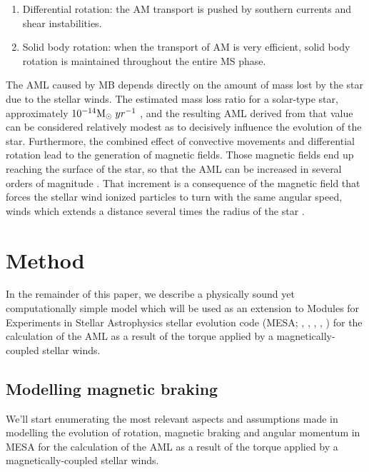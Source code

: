 \documentclass[fleqn,usenatbib]{mnras}
\begin{document}
\begin{enumerate}
    \item Differential rotation: the AM transport is pushed by southern currents and shear instabilities.
    \item Solid body rotation: when the transport of AM is very efficient, solid body rotation is 
    maintained throughout the entire MS phase.
\end{enumerate}

The AML caused by MB depends directly on the amount of mass lost by the star due to the stellar winds. The estimated mass loss ratio for a solar-type star, approximately $10^{-14}\mathrm{M}_\odot \; yr^{-1}$ \citep{Noerdlinger2008}, and the resulting AML derived from that value can be considered relatively modest as to decisively influence the evolution of the star. Furthermore, the combined effect of convective movements and differential rotation lead to the generation of magnetic fields. Those magnetic fields end up reaching the surface of the star, so that the AML can be increased in several orders of magnitude \citep{Langer2012}. That increment is a consequence of the magnetic field that forces the stellar wind ionized particles to turn with the same angular speed, winds which extends a distance several times the radius of the star \citep[see][for more details]{UdDoula2002,Ud-Doula2007,Ud-Doula2008}.


\section{Method} \label{sec_2}

In the remainder of this paper, we describe a physically sound yet computationally simple model which will be used as an extension to Modules for Experiments in Stellar Astrophysics stellar evolution code (MESA; \citeauthor{Paxton2011} \citeyear{Paxton2011}, \citeyear{Paxton2013}, \citeyear{Paxton2015}, \citeyear{Paxton2018}, \citeyear{Paxton2019}) for the calculation of the AML as a result of the torque applied by a magnetically-coupled stellar winds. 

\subsection{Modelling magnetic braking} \label{mod_mb}
We'll start enumerating the most relevant aspects and assumptions made in modelling the evolution of rotation, magnetic braking and angular momentum in MESA for the calculation of the AML as a result of the torque applied by a magnetically-coupled stellar winds.\par 
\end{document}
